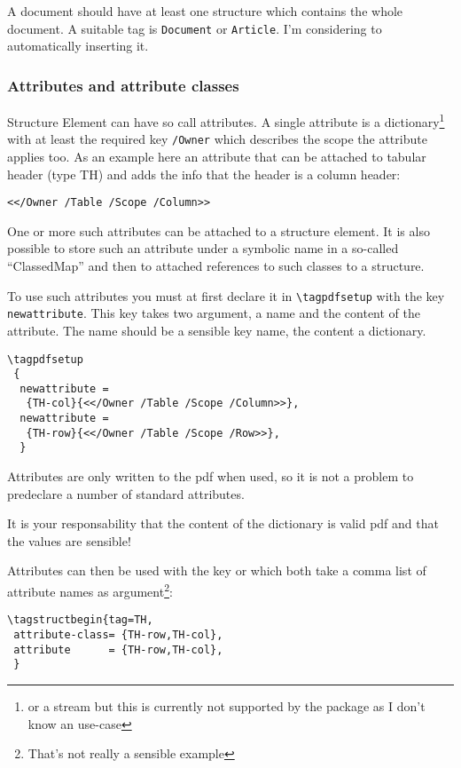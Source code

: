 \documentclass[DIV=12,parskip=half-,bibliography=totoc]{scrartcl}
\begin{document}
A document should have at least one structure which contains the whole document. A suitable tag is \texttt{Document} or \texttt{Article}. I'm considering to automatically inserting it.

\subsubsection{Attributes and attribute classes}\label{sec:attributes}

Structure Element can have so call attributes. A single attribute is a dictionary\footnote{or a stream but this is currently not supported by the package as I don't know an use-case} with at least the required key \verb+/Owner+ which describes the scope the attribute applies too.
As an example here an attribute that can be attached to tabular header (type TH) and adds the info that the header is a column header:
\begin{lstlisting}
<</Owner /Table /Scope /Column>>
\end{lstlisting}

One or more such attributes can be attached to a structure element. It is also possible to store such an attribute under a symbolic name in a so-called \enquote{ClassedMap} and then to attached references to such classes to a structure.

To use such attributes you must at first declare it in \verb+\tagpdfsetup+ with the key \texttt{newattribute}. This key takes two argument, a name and the content of the attribute.
The name should be a sensible key name, the content a dictionary.
\begin{lstlisting}
\tagpdfsetup
 {
  newattribute =
   {TH-col}{<</Owner /Table /Scope /Column>>},
  newattribute =
   {TH-row}{<</Owner /Table /Scope /Row>>},
  }
\end{lstlisting}

Attributes are only written to the pdf when used, so it is not a problem to predeclare a number of standard attributes.

It is your responsability that the content of the dictionary is valid pdf and that the values are sensible!

Attributes can then be used with the key  or  which both take a comma list of attribute names as argument\footnote{That's not really a sensible example}:
\begin{lstlisting}
\tagstructbegin{tag=TH,
 attribute-class= {TH-row,TH-col},
 attribute      = {TH-row,TH-col},
 }
\end{lstlisting}
\end{document}
